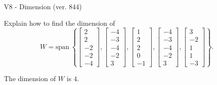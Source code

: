 \begin{exercise}
  \begin{exerciseTitle}V8 - Dimension (ver. 844)\end{exerciseTitle}
  \begin{exerciseStatement}
    Explain how to find the dimension of 
\[W=\mathrm{span}\ \left\{\left[\begin{array}{r}
2 \\
2 \\
-2 \\
-2 \\
-4
\end{array}\right] , \left[\begin{array}{r}
-4 \\
-3 \\
-4 \\
-2 \\
3
\end{array}\right] , \left[\begin{array}{r}
1 \\
2 \\
2 \\
0 \\
-1
\end{array}\right] , \left[\begin{array}{r}
-4 \\
-3 \\
-4 \\
-2 \\
3
\end{array}\right] , \left[\begin{array}{r}
3 \\
-2 \\
1 \\
1 \\
-3
\end{array}\right]\right\}.\]



  \end{exerciseStatement}
  \begin{exerciseAnswer}
   The dimension of \(W\) is  \(4\).
  


  \end{exerciseAnswer}
\end{exercise}